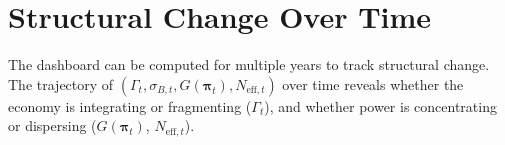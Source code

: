 \documentclass[../structural_economics_book.tex]{subfiles}
\begin{document}
\section{Structural Change Over Time}
\label{ch17:sec:time}

\begin{definition}\label{ch17:prop:tracking}
The dashboard can be computed for multiple years to track structural change. The trajectory of $(\Gamma_t, \sigma_{B,t}, G(\boldsymbol{\pi}_t), N_{\text{eff},t})$ over time reveals whether the economy is integrating or fragmenting ($\Gamma_t$), and whether power is concentrating or dispersing ($G(\boldsymbol{\pi}_t)$, $N_{\text{eff},t}$).
\end{definition}
\end{document}
